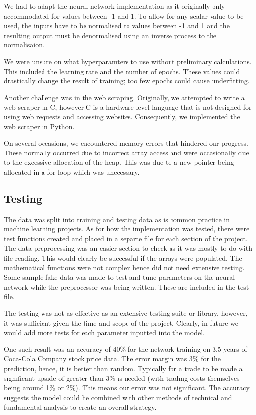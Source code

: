 \documentclass[11pt]{article}
\begin{document}
We had to adapt the neural network implementation as it originally only accommodated for values between -1 and 1.
To allow for any scalar value to be used, the inputs have to be normalised to values between -1 and 1 
and the resulting output must be denormalised using an inverse process to the normalisaion.

We were unsure on what hyperparamters to use without preliminary calculations. This included the learning rate and the number of epochs. These values could drastically change the result of training; too few epochs could cause underfitting. 

Another challenge was in the web scraping. Originally, we attempted to write a web scraper in C, however C is a hardware-level language that is not designed for using web requests and accessing websites. Consequently, we implemented the web scraper in Python.

On several occasions, we encountered memory errors that hindered our progress. These normally occurred due to incorrect array access and were occasionally due to the excessive allocation of the heap. This was due to a new pointer being allocated in a for loop which was unecessary. 

\subsection{Testing}
The data was split into training and testing data as is common practice in machine learning projects. As for how the implementation was tested, there were test functions created and placed in a separte file for each section of the project. The data preprocessing was an easier section to check as it was mostly to do with file reading. This would clearly be successful if the arrays were populated. The mathematical functions were not complex hence did not need extensive testing. Some sample fake data was made to test and tune parameters on the neural network while the preprocessor was being written. These are included in the test file. 

The testing was not as effective as an extensive testing suite or library, however, it was sufficient given the time and scope of the project. Clearly, in future we would add more tests for each parameter inputted into the model.

One such result was an accuracy of 40\% for the network training on 3.5 years of Coca-Cola Company stock price data. The error margin was 3\% for the prediction, hence, it is better than random. Typically for a trade to be made a significant upside of greater than 3\% is needed (with trading costs themselves being around 1\% or 2\%). This means our error was not significant. The accuracy suggests the model could be combined with other methods of technical and fundamental analysis to create an overall strategy. 
\end{document}
